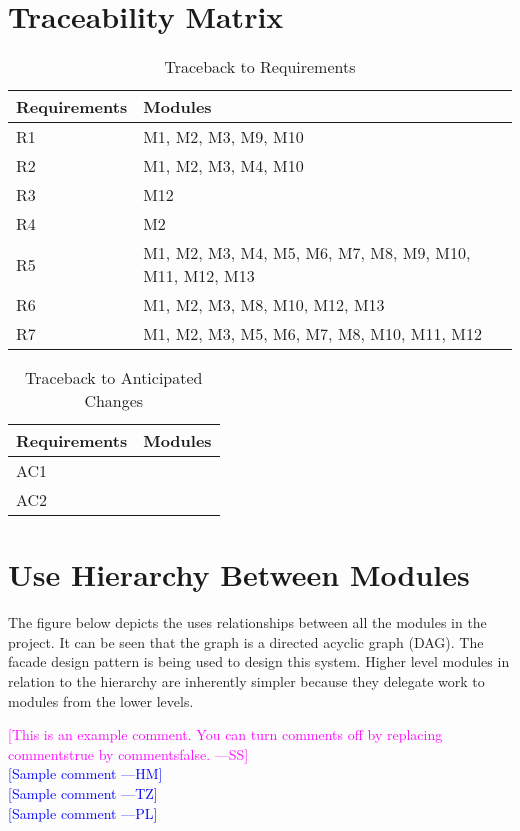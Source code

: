 \documentclass[titlepage]{article}
\newcommand{\authornote}[3]{\textcolor{#1}{[#3 ---#2]}}
\newcommand{\authornote}[3]{}
\newcommand{\wss}[1]{\authornote{magenta}{SS}{#1}}
\newcommand{\hm}[1]{\authornote{blue}{HM}{#1}} %
\newcommand{\tz}[1]{\authornote{blue}{TZ}{#1}} %
\newcommand{\pl}[1]{\authornote{blue}{PL}{#1}} %
\begin{document}
\section{Traceability Matrix}
\begin{table}[h!]
\centering
    \begin{tabular}{| p{5cm} | p{5cm} |}    \hline
    Requirements &Modules\\ \hline
    
      R1  &M1, M2, M3, M9, M10 \\ \hline
      R2  &M1, M2, M3, M4, M10 \\ \hline
      R3  &M12 \\ \hline
      R4  &M2 \\ \hline
      R5  &M1, M2, M3, M4, M5, M6, M7, M8, M9, M10, M11, M12, M13 \\ \hline
      R6  &M1, M2, M3, M8, M10, M12, M13 \\ \hline
      R7  &M1, M2, M3, M5, M6, M7, M8, M10, M11, M12 \\ \hline
      
    \end{tabular}
    \caption{Traceback to Requirements}
\label{table:Traceback to Requirements}
\end{table}

\begin{table}[h!]
\centering
    \begin{tabular}{| p{5cm} | p{5cm} |}    \hline
    Requirements &Modules\\ \hline
    
      AC1  & \\ \hline
      AC2  & \\ \hline
      
    \end{tabular}
    \caption{Traceback to Anticipated Changes}
\label{table:Traceback to Anticipated Changes}
\end{table}


\section{Use Hierarchy Between Modules}
The figure below depicts the uses relationships between all the modules in the project. It can be seen that the graph is a directed acyclic graph (DAG). The facade design pattern is being used to design this system. Higher level modules in relation to the hierarchy are inherently simpler because they delegate work to  modules from the lower levels.



\noindent \wss{This is an example comment.  You can turn comments off by replacing
  commentstrue by commentsfalse.}\\
\hm{Sample comment}\\
\tz{Sample comment}\\
\pl{Sample comment}
\end{document}
